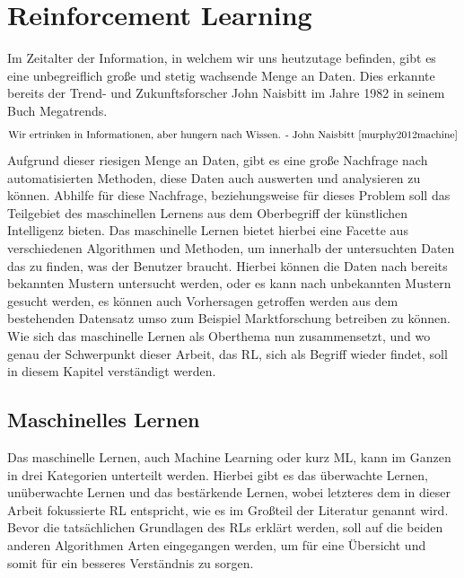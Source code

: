 \documentclass[]{iat}
\begin{document}
\chapter{Reinforcement Learning} \label{sec:reinforcement_learning}
Im Zeitalter der Information, in welchem wir uns heutzutage befinden, gibt es eine unbegreiflich große und stetig wachsende Menge an Daten. Dies erkannte bereits der Trend- und Zukunftsforscher John Naisbitt im Jahre 1982 in seinem Buch Megatrends.
\begin{align*}
    \text{Wir ertrinken in Informationen, aber hungern nach Wissen. - John Naisbitt \cite[]{murphy2012machine}}
\end{align*}
Aufgrund dieser riesigen Menge an Daten, gibt es eine große Nachfrage nach automatisierten Methoden, diese Daten auch auswerten und analysieren zu können. Abhilfe für diese Nachfrage, beziehungsweise für dieses Problem soll das Teilgebiet des maschinellen Lernens aus dem Oberbegriff der künstlichen Intelligenz bieten. Das maschinelle Lernen bietet hierbei eine Facette aus verschiedenen Algorithmen und Methoden, um innerhalb der untersuchten Daten das zu finden, was der Benutzer braucht. Hierbei können die Daten nach bereits bekannten Mustern untersucht werden, oder es kann nach unbekannten Mustern gesucht werden, es können auch Vorhersagen getroffen werden aus dem bestehenden Datensatz umso zum Beispiel Marktforschung betreiben zu können. Wie sich das maschinelle Lernen als Oberthema nun zusammensetzt, und wo genau der Schwerpunkt dieser Arbeit, das RL, sich als Begriff wieder findet, soll in diesem Kapitel verständigt werden.

\section{Maschinelles Lernen} \label{sec:machine_learning}
Das maschinelle Lernen, auch Machine Learning oder kurz ML, kann im Ganzen in drei Kategorien unterteilt werden. Hierbei gibt es das überwachte Lernen, unüberwachte Lernen und das bestärkende Lernen, wobei letzteres dem in dieser Arbeit fokussierte RL entspricht, wie es im Großteil der Literatur genannt wird. \cite[]{Sutton1998} Bevor die tatsächlichen Grundlagen des RLs erklärt werden, soll auf die beiden anderen Algorithmen Arten eingegangen werden, um für eine Übersicht und somit für ein besseres Verständnis zu sorgen.
\end{document}
